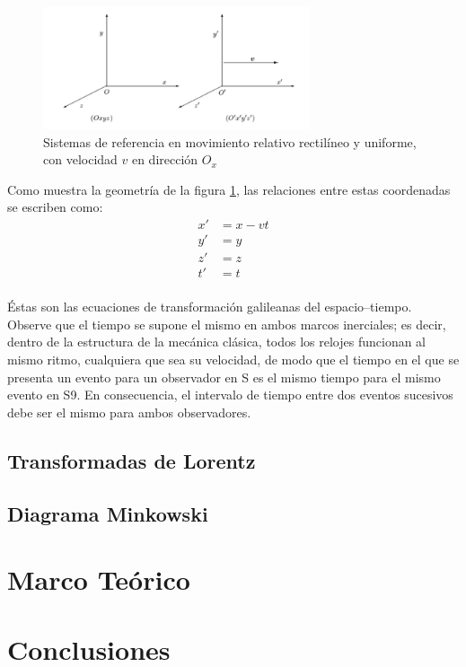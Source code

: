 \documentclass[12pt,twoside]{rif}
\begin{document}
	\begin{figure}[h!]
		\centering
		\includegraphics[width=0.7\textwidth]{img/Galileo.PNG}
		\caption{Sistemas de referencia en movimiento relativo rectilíneo
		y uniforme, con velocidad $v$ en dirección $O_{x}$ }
		\label{fig:01}
		\end{figure}

		Como muestra la geometría de la figura \ref*{fig:01}, las relaciones entre estas coordenadas se escriben 
		como:
		\begin{align*}
			x'&=x-vt\\
			y'&=y\\
			z'&=z\\
			t'&=t\\
		\end{align*}

		Éstas son las ecuaciones de transformación galileanas del espacio–tiempo. Observe que
		el tiempo se supone el mismo en ambos marcos inerciales; es decir, dentro de la estructura de la mecánica clásica, todos los relojes funcionan al mismo ritmo, cualquiera que
		sea su velocidad, de modo que el tiempo en el que se presenta un evento para un observador en S es el mismo tiempo para el mismo evento en S9. En consecuencia, el intervalo
		de tiempo entre dos eventos sucesivos debe ser el mismo para ambos observadores.
\newpage
	\subsection{Transformadas de Lorentz}
	\subsection{Diagrama Minkowski}
	
	
	
	\section{Marco Teórico}

	
		
	\section{Conclusiones}
	
	\nocite{*}
	
	
	
\end{document}
